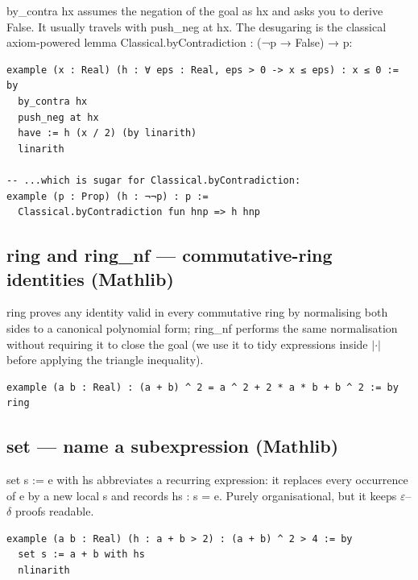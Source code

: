 \documentclass[12pt, openany]{book}
\theoremstyle{plain}
\theoremstyle{definition}
\theoremstyle{remark}
\newcommand{\li}[1]{{\ttfamily\small\color{tealaccent}#1}}
\begin{document}
\li{by\_contra hx} assumes the negation of the goal as \li{hx} and asks you to derive \li{False}.  It usually travels with \li{push\_neg at hx}.  The desugaring is the classical axiom-powered lemma \li{Classical.byContradiction : (¬p → False) → p}:

\begin{leanbox}
\begin{lstlisting}
example (x : Real) (h : ∀ eps : Real, eps > 0 -> x ≤ eps) : x ≤ 0 := by
  by_contra hx
  push_neg at hx
  have := h (x / 2) (by linarith)
  linarith

-- ...which is sugar for Classical.byContradiction:
example (p : Prop) (h : ¬¬p) : p :=
  Classical.byContradiction fun hnp => h hnp
\end{lstlisting}
\end{leanbox}
\color{black}

\subsection*{\li{ring} and \li{ring\_nf} --- commutative-ring identities \textbf{(Mathlib)}}

\li{ring} proves any identity valid in every commutative ring by normalising both sides to a canonical polynomial form; \li{ring\_nf} performs the same normalisation without requiring it to close the goal (we use it to tidy expressions inside $|\cdot|$ before applying the triangle inequality).

\begin{leanbox}
\begin{lstlisting}
example (a b : Real) : (a + b) ^ 2 = a ^ 2 + 2 * a * b + b ^ 2 := by ring
\end{lstlisting}
\end{leanbox}
\color{black}

\subsection*{\li{set} --- name a subexpression \textbf{(Mathlib)}}

\li{set s := e with hs} abbreviates a recurring expression: it replaces every occurrence of \li{e} by a new local \li{s} and records \li{hs : s = e}.  Purely organisational, but it keeps $\varepsilon$--$\delta$ proofs readable.

\begin{leanbox}
\begin{lstlisting}
example (a b : Real) (h : a + b > 2) : (a + b) ^ 2 > 4 := by
  set s := a + b with hs
  nlinarith
\end{lstlisting}
\end{leanbox}
\color{black}
\end{document}
